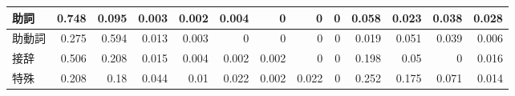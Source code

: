\begin{table}
\begin{center}
\begin{tabular}{l|r|r|r|r|r|r|r|r|r|r|r|r}
   \hline
   助詞      & 0.748 &  0.095 &  0.003 &  0.002 &  0.004 
             &      0 &     0  &     0  &  0.058
             &  0.023 &  0.038 &  0.028  \\
   \hline
   助動詞    & 0.275 &  0.594&  0.013 &  0.003 &      0 
             &      0 &      0 &      0 &  0.019
             &  0.051 &  0.039 &  0.006  \\
   \hline
   接辞      & 0.506 &  0.208&  0.015 &  0.004 &  0.002
             &  0.002 &      0 &      0 & 0.198
             &  0.05 &      0 &  0.016  \\
   \hline
   特殊      & 0.208 & 0.18 &  0.044 & 0.01 &  0.022 
             &  0.002 &  0.022 &     0  & 0.252
             & 0.175 &  0.071 & 0.014  \\
   \hline
\end{tabular}
\end{center}
\end{table}

